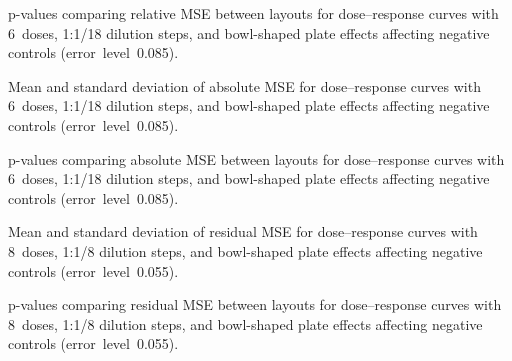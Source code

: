 \begin{table}[p]
    \centering
    \small
    
    \caption{p-values comparing relative \ECIC{} MSE between layouts for dose--response curves with 6~doses, 1:1/18 dilution steps, and bowl-shaped plate effects affecting negative controls (error~level~0.085).}
    \label{tab:dr-relic50-pvalues-6doses-dil18-bowl-neg-controls-0.085}
\end{table}

\begin{table}[p]
    \centering
    \small
    
    \caption{Mean and standard deviation of absolute \ECIC{} MSE for dose--response curves with 6~doses, 1:1/18 dilution steps, and bowl-shaped plate effects affecting negative controls (error~level~0.085).}
    \label{tab:dr-absic50-mean-std-6doses-dil18-bowl-neg-controls-0.085}
\end{table}

\begin{table}[p]
    \centering
    \small
    
    \caption{p-values comparing absolute \ECIC{} MSE between layouts for dose--response curves with 6~doses, 1:1/18 dilution steps, and bowl-shaped plate effects affecting negative controls (error~level~0.085).}
    \label{tab:dr-absic50-pvalues-6doses-dil18-bowl-neg-controls-0.085}
\end{table}

\clearpage
\begin{table}[p]
    \centering
    \small
    
    \caption{Mean and standard deviation of residual MSE for dose--response curves with 8~doses, 1:1/8 dilution steps, and bowl-shaped plate effects affecting negative controls (error~level~0.055).}
    \label{tab:dr-residuals-mean-std-8doses-dil8-bowl-neg-controls-0.055}
\end{table}

\begin{table}[p]
    \centering
    \small
    
    \caption{p-values comparing residual MSE between layouts for dose--response curves with 8~doses, 1:1/8 dilution steps, and bowl-shaped plate effects affecting negative controls (error~level~0.055).}
    \label{tab:dr-residuals-pvalues-8doses-dil8-bowl-neg-controls-0.055}
\end{table}


